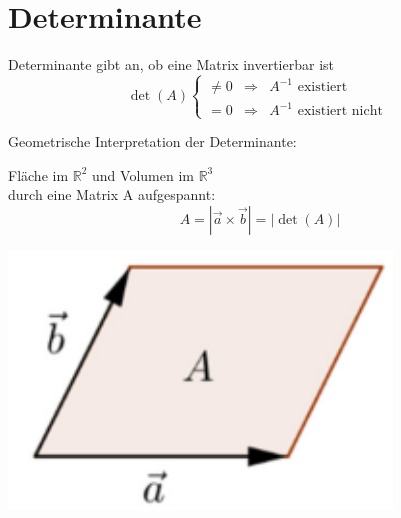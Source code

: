 \graphicspath{{images/}}

\section{Determinante}

    \begin{definition}{Determinante}
        gibt an, ob eine Matrix invertierbar ist
        \begin{equation*}
            \det(A)
            \left\{
                \begin{array}{lll}
                    \neq 0   &\Rightarrow    & A^{-1} \text{ existiert }\\
                    = 0     &\Rightarrow    & A^{-1} \text{ existiert nicht }
                \end{array}
            \right.
        \end{equation*}
    \end{definition}

    

    \begin{definition}{Geometrische Interpretation} der Determinante:\\
        \begin{minipage}{0.7\linewidth}
        Fläche im $\mathbb{R}^2$ und Volumen im $\mathbb{R}^3$\\
        durch eine Matrix A aufgespannt:
        $$A = |\vec{a} \times \vec{b}| = |\det(A)|$$
        \end{minipage}
        \begin{minipage}{0.25\linewidth}
            \includegraphics[width=1\linewidth]{determinante.png}
        \end{minipage}
    \end{definition}

